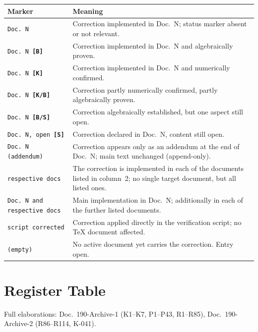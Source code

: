 \begin{center}
\renewcommand{\arraystretch}{1.3}
\small
\begin{tabular}{@{}p{4.8cm}p{8.7cm}@{}}
\toprule
Marker & Meaning \\
\midrule
\texttt{Doc.~N} & Correction implemented in Doc.~N; status marker absent or not relevant. \\[2pt]
\texttt{Doc.~N \textbf{[B]}} & Correction implemented in Doc.~N and algebraically proven. \\[2pt]
\texttt{Doc.~N \textbf{[K]}} & Correction implemented in Doc.~N and numerically confirmed. \\[2pt]
\texttt{Doc.~N \textbf{[K/B]}} & Correction partly numerically confirmed, partly algebraically proven. \\[2pt]
\texttt{Doc.~N \textbf{[B/S]}} & Correction algebraically established, but one aspect still open. \\[2pt]
\texttt{Doc.~N, open \textbf{[S]}} & Correction declared in Doc.~N, content still open. \\[2pt]
\texttt{Doc.~N (addendum)} & Correction appears only as an addendum at the end of Doc.~N; main text unchanged (append-only). \\[2pt]
\texttt{respective docs} & The correction is implemented in each of the documents listed in column~2; no single target document, but all listed ones. \\[2pt]
\texttt{Doc.~N and respective docs} & Main implementation in Doc.~N; additionally in each of the further listed documents. \\[2pt]
\texttt{script corrected} & Correction applied directly in the verification script; no \TeX{} document affected. \\[2pt]
\texttt{(empty)} & No active document yet carries the correction. Entry open. \\
\bottomrule
\end{tabular}
\renewcommand{\arraystretch}{1.0}
\end{center}

\section{Register Table}

\noindent Full elaborations: Doc.~190-Archive-1 (K1–K7, P1–P43, R1–R85),
Doc.~190-Archive-2 (R86–R114, K-041).

